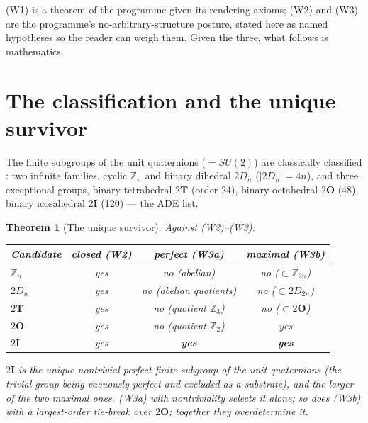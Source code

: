 \documentclass[12pt]{article}
\newtheorem{theorem}{Theorem}
\theoremstyle{definition}
\theoremstyle{remark}
\newcommand{\twoI}{2\mathbf{I}}
\newcommand{\twoT}{2\mathbf{T}}
\newcommand{\twoO}{2\mathbf{O}}
\begin{document}
(W1) is a theorem of the programme given its rendering axioms; (W2) and (W3) are the programme's no-arbitrary-structure posture, stated here as named hypotheses so the reader can weigh them. Given the three, what follows is mathematics.

\section{The classification and the unique survivor}\label{sec:survivor}

The finite subgroups of the unit quaternions ($= SU(2)$) are classically classified \citep{Klein1884, Conway2003}: two infinite families, cyclic $\mathbb Z_n$ and binary dihedral $2D_n$ ($|2D_n| = 4n$), and three exceptional groups, binary tetrahedral $\twoT$ (order 24), binary octahedral $\twoO$ (48), binary icosahedral $\twoI$ (120) --- the ADE list.

\begin{theorem}[The unique survivor]\label{thm:survivor}
Against (W2)--(W3):
\begin{center}
\begin{tabular}{lccc}
\toprule
Candidate & closed (W2) & perfect (W3a) & maximal (W3b) \\
\midrule
$\mathbb Z_n$ & yes & no (abelian) & no ($\subset \mathbb Z_{2n}$) \\
$2D_n$ & yes & no (abelian quotients) & no ($\subset 2D_{2n}$) \\
$\twoT$ & yes & no (quotient $\mathbb Z_3$) & no ($\subset \twoO$) \\
$\twoO$ & yes & no (quotient $\mathbb Z_2$) & yes \\
$\twoI$ & yes & \textbf{yes} & \textbf{yes} \\
\bottomrule
\end{tabular}
\end{center}
$\twoI$ is the unique \emph{nontrivial} perfect finite subgroup of the unit quaternions (the trivial group being vacuously perfect and excluded as a substrate), and the larger of the two maximal ones. (W3a) with nontriviality selects it alone; so does (W3b) with a largest-order tie-break over $\twoO$; together they overdetermine it.
\end{theorem}
\end{document}
